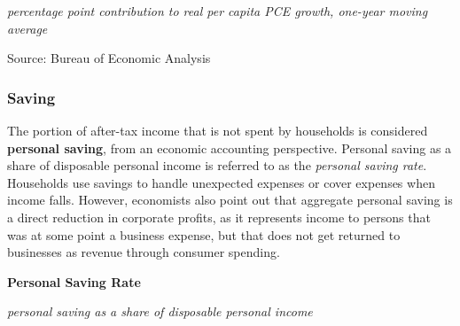 \documentclass{report}
\makeatletter
\newcommand{\tbllink}[1]{\href{https://raw.githubusercontent.com/bdecon/US-chartbook/master/chartbook/data/#1}{\faTable}}
\newcommand*\short[1]{\expandafter\@gobbletwo\number\numexpr#1\relax}
\newcommand{\sbar}[4]{
		\addplot[ybar stacked, bar width=2.6pt, draw opacity=0, fill=#1] 
			table [x=#2, y=#3, col sep=comma]{#4};}
\newcommand{\dateaxisticks}{
		date coordinates in=x, axis line style={draw=none},
		xmax={2020-08-10},
		max space between ticks=40,	    
		xtick={{1990-01-01}, {1992-01-01}, {1994-01-01}, 
			{1996-01-01}, {1998-01-01}, {2000-01-01}, 
			{2002-01-01}, {2004-01-01}, {2006-01-01},
			{2008-01-01}, {2010-01-01}, {2012-01-01}, {2014-01-01},
		    {2016-01-01}, {2018-01-01}, {2020-01-01}},
		minor xtick={{1989-01-01}, {1991-01-01}, {1993-01-01},
			{1995-01-01}, {1997-01-01}, {1999-01-01}, 
			{2001-01-01}, {2003-01-01}, {2005-01-01}, {2007-01-01},
		    {2009-01-01}, {2011-01-01}, {2013-01-01}, {2015-01-01},
		    {2017-01-01}, {2019-01-01}},
		enlarge y limits={0.06}, enlarge x limits={0.01},
		}
\newcommand{\bbar}[2]{extra #1 ticks = {{#2}}, extra #1 tick labels = ,
		extra #1 tick style = {grid=major, grid style={thick, black!25}},}
\newcommand{\stdline}[4]{\addplot[very thick, no markers, color=#1] 
		table [x=#2, y=#3, col sep=comma] {#4};	}
\newcommand{\rbars}{
		\fill[color=black!10] (axis cs:{1990-07-01},\pgfkeysvalueof{/pgfplots/ymin}) rectangle 
			(axis cs:{1991-03-01}, \pgfkeysvalueof{/pgfplots/ymax});
		\fill[color=black!10] (axis cs:{2007-12-01},\pgfkeysvalueof{/pgfplots/ymin}) rectangle 
			(axis cs:{2009-07-01}, \pgfkeysvalueof{/pgfplots/ymax});
		\fill[color=black!10] (axis cs:{2001-03-01},\pgfkeysvalueof{/pgfplots/ymin}) rectangle 
			(axis cs:{2001-11-01}, \pgfkeysvalueof{/pgfplots/ymax});
		\fill[color=black!10] (axis cs:{2020-02-01},\pgfkeysvalueof{/pgfplots/ymin}) rectangle 
			(axis cs:{2020-09-01}, \pgfkeysvalueof{/pgfplots/ymax});}
\makeatother
\begin{document}
{{{\begin{minipage}{0.76\textwidth}
\footnotesize{\textit{percentage point contribution to real per capita PCE growth, one-year moving average}}

\hspace*{-2mm} 

\footnotesize{Source: Bureau of Economic Analysis} \hfill \tbllink{pcedecomp.csv}

\end{minipage}

\newpage


\begin{minipage}{0.76\textwidth}

\subsubsection*{\color{black!70} \seriffont Saving}

\small The portion of after-tax income that is not spent by households is considered \textbf{personal saving}, from an economic accounting perspective. Personal saving as a share of disposable personal income is referred to as the \textit{personal saving rate}. Households use savings to handle unexpected expenses or cover expenses when income falls. However, economists also point out that aggregate personal saving is a direct reduction in corporate profits, as it represents income to persons that was at some point a business expense, but that does not get returned to businesses as revenue through consumer spending. \\



\vspace{4mm}

\normalsize \textbf{Personal Saving Rate}

\footnotesize{\textit{personal saving as a share of disposable personal income}}


\end{minipage}}}}
\end{document}
